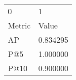 \begin{tabular}{ll}
0 & 1 \\
Metric & Value \\
AP & 0.834295 \\
P@5 & 1.000000 \\
P@10 & 0.900000 \\
\end{tabular}
